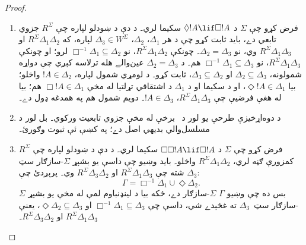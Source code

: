\documentclass[../../../include/open-logic-section]{subfiles}
\begin{document}
\begin{proof}
  \begin{enumerate}
  \item فرض کړو چې $\Sigma$ د $\Diamond !A \lif
    \Box !A$ سکيما لري۔ د دې د ښودلو لپاره چې $R^\Sigma$ جزوي تابعي دے، بايد
    ثابت کړو چې د هر $\Delta_1$، $\Delta_2$، $\Delta_3 \in
    W^\Sigma$ لپاره، که $R^\Sigma \Delta_1\Delta_2$ او $R^\Sigma
    \Delta_1\Delta_3$ وي، نو $\Delta_2=\Delta_3$۔ چونکې $R^\Sigma
    \Delta_1\Delta_2$، نو $\Box^{-1}\Delta_1 \subseteq \Delta_2$ لرو؛
    او چونکې $R^\Sigma \Delta_1\Delta_3$، نو $\Box^{-1}\Delta_1
    \subseteq \Delta_3$ هم۔ د $\Delta_2=\Delta_3$ عين‌والے
    هله ترلاسه کېږي چې دواړه شمولونه، $\Delta_2 \subseteq \Delta_3$ او $\Delta_3 \subseteq
    \Delta_2$، ثابت کړو۔ د لومړي شمول لپاره، $!A \in \Delta_2$ واخلو؛ بيا
    $\Diamond!A \in \Delta_1$، او د سکيما او د $\Delta_1$ د اشتقاقي تړلتيا
    له مخې $\Box!A \in \Delta_1$ هم؛ بيا له هغې فرضيې چې
    $R^\Sigma \Delta_1\Delta_3$، $!A \in \Delta_3$۔ دويم
    شمول هم په همدغه ډول دے۔

  \item د دوه‌اړخيزې طرحې يو لور د~
    برخې له مخې جزوي تابعيت ورکوي۔ بل لور د مسلسل‌والي بديهي
    اصل دے؛ په  کښې ئې ثبوت وګورئ۔

  \item فرض کړو چې $\Sigma$ د $\Box\Box!A \lif \Box!A$ سکيما لري۔
    د دې د ښودلو لپاره چې $R^\Sigma$ کمزورې ګڼه لري، $R^\Sigma
    \Delta_1\Delta_2$ واخلو۔ بايد وښيو چې داسې يو بشپړ
    $\Sigma$-سازګار سټ $\Delta_3$ شته چې $R^\Sigma
    \Delta_1\Delta_3$ او $R^\Sigma \Delta_3\Delta_2$ وي۔ پرېږدئ چې:
    \[
    \Gamma = \Box^{-1}\Delta_1 \cup \Diamond\Delta_2.
    \]
    بس ده چې وښيو $\Gamma$ $\Sigma$-سازګار دے، ځکه بيا
    د لينډنباوم لمې له مخې يو بشپړ
    $\Sigma$-سازګار سټ~$\Delta_3$ ته غځېدے شي، داسې چې $\Box^{-1}\Delta_1
    \subseteq \Delta_3$ او $\Diamond\Delta_2 \subseteq \Delta_3$،
    يعنې $R^\Sigma \Delta_1\Delta_3$ او $R^\Sigma
    \Delta_3\Delta_2$۔


\end{enumerate}
\end{proof}
\end{document}
